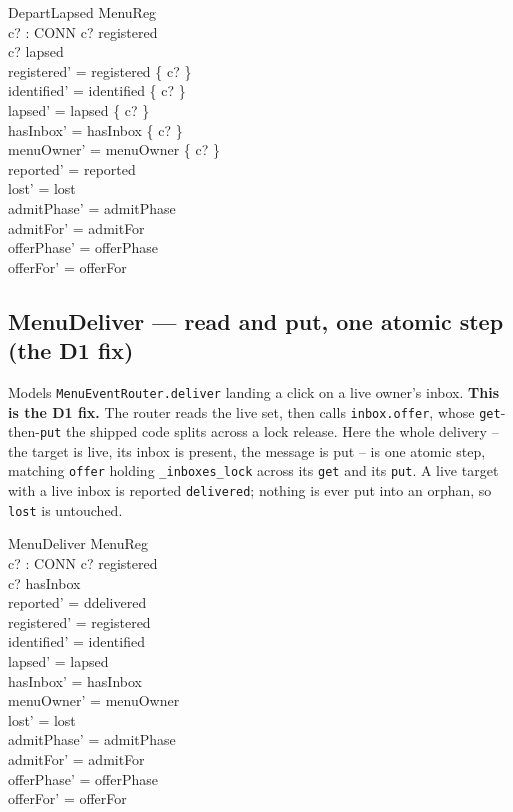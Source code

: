 \documentclass[a4paper,10pt,fleqn]{article}
\begin{document}
\begin{schema}{DepartLapsed}
  \Delta MenuReg \\
  c? : CONN
\where
  c? \in registered \\
  c? \in lapsed \\
  registered' = registered \setminus \{ c? \} \\
  identified' = identified \setminus \{ c? \} \\
  lapsed' = lapsed \setminus \{ c? \} \\
  hasInbox' = hasInbox \setminus \{ c? \} \\
  menuOwner' = menuOwner \setminus \{ c? \} \\
  reported' = reported \\
  lost' = lost \\
  admitPhase' = admitPhase \\
  admitFor' = admitFor \\
  offerPhase' = offerPhase \\
  offerFor' = offerFor
\end{schema}

\subsection{MenuDeliver --- read and put, one atomic step (the D1 fix)}
\label{sec:menudeliver}

Models \texttt{MenuEventRouter.deliver} landing a click on a live owner's
inbox. \textbf{This is the D1 fix.} The router reads the live set, then
calls \texttt{inbox.offer}, whose \texttt{get}-then-\texttt{put} the shipped
code splits across a lock release. Here the whole delivery -- the target is
live, its inbox is present, the message is put -- is one atomic step,
matching \texttt{offer} holding \texttt{\_inboxes\_lock} across its
\texttt{get} and its \texttt{put}. A live target with a live inbox is
reported \texttt{delivered}; nothing is ever put into an orphan, so
\texttt{lost} is untouched.

\begin{schema}{MenuDeliver}
  \Delta MenuReg \\
  c? : CONN
\where
  c? \in registered \\
  c? \in hasInbox \\
  reported' = ddelivered \\
  registered' = registered \\
  identified' = identified \\
  lapsed' = lapsed \\
  hasInbox' = hasInbox \\
  menuOwner' = menuOwner \\
  lost' = lost \\
  admitPhase' = admitPhase \\
  admitFor' = admitFor \\
  offerPhase' = offerPhase \\
  offerFor' = offerFor
\end{schema}
\end{document}
